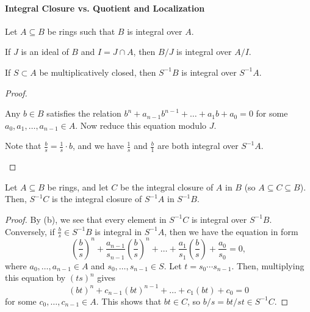 \paragraph{Integral Closure vs. Quotient and Localization}
\begin{proposition}
    \label{prop:integral_quotient_localize}
    Let $A\subseteq B$ be rings such that $B$ 
    is integral over $A$.
    \begin{alphenum}
    \item If $J$ is an ideal of $B$ and 
    $I = J\cap A$, then $B/J$ is integral over $A/I$.
    \item If $S\subset A$ be multiplicatively
    closed, then $S^{-1}B$ is integral over $S^{-1}A$.
    \end{alphenum}
\end{proposition}
\begin{proof}
    \begin{alphenum}
    \item Any $b\in B$ satisfies the relation 
    $b^n + a_{n-1}b^{n-1} + \dots + a_1b +a_0=0$
    for some $a_0,a_1,\dots,a_{n-1}\in A$.
    Now reduce this equation modulo $J$.
    \item Note that $\frac bs = \frac 1s\cdot b$, and we have
    $\frac 1s$ and $\frac b1$ are both integral over $S^{-1}A$.
    \qedhere
    \end{alphenum}
\end{proof}
\begin{proposition}
\label{prop:integral_closure_local}
Let $A\subseteq B$ be rings,
and let $C$ be the integral closure of $A$ in $B$
(so $A\subseteq C\subseteq B$).
Then, $S^{-1}C$ is the integral closure of $S^{-1}A$
in $S^{-1}B$.
\end{proposition}
\begin{proof}
    By  (b),
    we see that every element in $S^{-1}C$ is integral
    over $S^{-1}B$. 
    Conversely, if $\tfrac bs\in S^{-1}B$ is integral in
    $S^{-1}A$, then we have the equation in form
    $$\left(\frac bs\right)^n 
    + \frac{a_{n-1}}{s_{n-1}}\left(\frac bs\right)^n
    + \dots + \frac{a_1}{s_1}\left(\frac bs\right)
    + \frac{a_0}{s_0} = 0,$$
    where $a_0,\dots,a_{n-1}\in A$ and $s_0,\dots,s_{n-1}\in S$.
    Let $t = s_0\cdots s_{n-1}$. 
    Then, multiplying this equation by $(ts)^n$ gives 
    $$(bt)^n + c_{n-1}(bt)^{n-1} + \dots + c_1(bt) + c_0=0$$
    for some $c_0,\dots,c_{n-1}\in A$.
    This shows that $bt\in C$, so $b/s = bt/st \in S^{-1}C$.
\end{proof}
